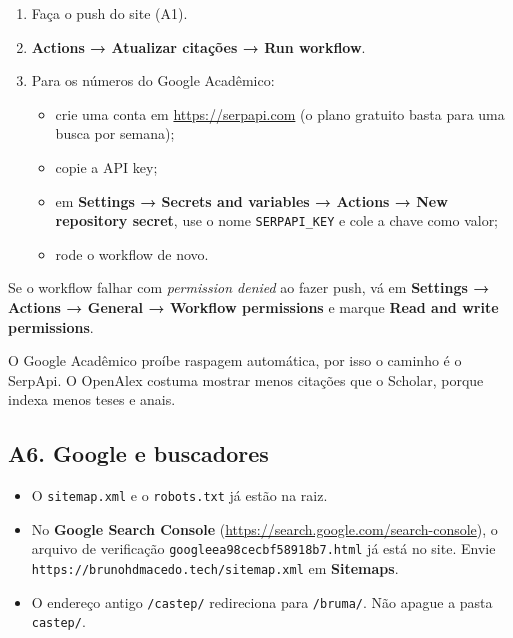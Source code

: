 \documentclass[
  10pt,
]{article}
\providecommand{\tightlist}{%
  \setlength{\itemsep}{0pt}\setlength{\parskip}{0pt}}
\renewenvironment{quote}{\def\FrameCommand{{\color{ambar}\vrule width 3pt}\hspace{8pt}\colorbox{fundo}}\MakeFramed{\advance\hsize-\width\FrameRestore}\small}{\endMakeFramed}
\begin{document}
\begin{enumerate}
\def\labelenumi{\arabic{enumi}.}
\tightlist
\item
  Faça o push do site (A1).
\item
  \textbf{Actions → Atualizar citações → Run workflow}.
\item
  Para os números do Google Acadêmico:

  \begin{itemize}
  \tightlist
  \item
    crie uma conta em \url{https://serpapi.com} (o plano gratuito basta
    para uma busca por semana);
  \item
    copie a API key;
  \item
    em \textbf{Settings → Secrets and variables → Actions → New
    repository secret}, use o nome \texttt{SERPAPI\_\allowbreak{}KEY} e
    cole a chave como valor;
  \item
    rode o workflow de novo.
  \end{itemize}
\end{enumerate}

Se o workflow falhar com \emph{permission denied} ao fazer push, vá em
\textbf{Settings → Actions → General → Workflow permissions} e marque
\textbf{Read and write permissions}.

\begin{quote}
O Google Acadêmico proíbe raspagem automática, por isso o caminho é o
SerpApi. O OpenAlex costuma mostrar menos citações que o Scholar, porque
indexa menos teses e anais.
\end{quote}

\hypertarget{a6.-google-e-buscadores}{%
\subsection{A6. Google e buscadores}\label{a6.-google-e-buscadores}}

\begin{itemize}
\tightlist
\item
  O \texttt{sitemap.\allowbreak{}xml} e o
  \texttt{robots.\allowbreak{}txt} já estão na raiz.
\item
  No \textbf{Google Search Console}
  (\url{https://search.google.com/search-console}), o arquivo de
  verificação \texttt{googleea98cecbf58918b7.\allowbreak{}html} já está
  no site. Envie
  \texttt{https:\allowbreak{}/\allowbreak{}/\allowbreak{}brunohdmacedo.\allowbreak{}tech/\allowbreak{}sitemap.\allowbreak{}xml}
  em \textbf{Sitemaps}.
\item
  O endereço antigo \texttt{/\allowbreak{}castep/\allowbreak{}}
  redireciona para \texttt{/\allowbreak{}bruma/\allowbreak{}}. Não
  apague a pasta \texttt{castep/\allowbreak{}}.
\end{itemize}
\end{document}
